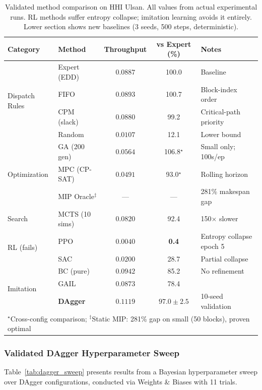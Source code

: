 \documentclass[11pt,a4paper]{article}
\begin{document}
\begin{table}[h]
\centering
\caption{Validated method comparison on HHI Ulsan. All values from actual experimental runs. RL methods suffer entropy collapse; imitation learning avoids it entirely. Lower section shows new baselines (3 seeds, 500 steps, deterministic).}
\label{tab:results_main}
\begin{tabular}{llccl}
\toprule
Category & Method & Throughput & vs Expert (\%) & Notes \\
\midrule
\multirow{4}{*}{Dispatch Rules}
& Expert (EDD) & $0.0887$ & 100.0 & Baseline \\
& FIFO & $0.0893$ & 100.7 & Block-index order \\
& CPM (slack) & $0.0880$ & 99.2 & Critical-path priority \\
& Random & $0.0107$ & 12.1 & Lower bound \\
\midrule
\multirow{3}{*}{Optimization}
& GA (200 gen) & $0.0564$ & 106.8$^\star$ & Small only; 100s/ep \\
& MPC (CP-SAT) & $0.0491$ & 93.0$^\star$ & Rolling horizon \\
& MIP Oracle$^\ddag$ & --- & --- & 281\% makespan gap \\
\midrule
Search
& MCTS (10 sims) & $0.0820$ & 92.4 & 150$\times$ slower \\
\midrule
\multirow{2}{*}{RL (fails)}
& PPO & $0.0040$ & \textbf{0.4} & Entropy collapse epoch 5 \\
& SAC & $0.0200$ & 28.7 & Partial collapse \\
\midrule
\multirow{3}{*}{Imitation}
& BC (pure) & $0.0942$ & 85.2 & No refinement \\
& GAIL & $0.0873$ & 78.4 & \\
& \textbf{DAgger} & $\mathbf{0.1119}$ & $\mathbf{97.0 \pm 2.5}$ & 10-seed validation \\
\bottomrule
\multicolumn{5}{l}{\footnotesize $^\star$Cross-config comparison; $^\ddag$Static MIP: 281\% gap on small (50 blocks), proven optimal} \\
\end{tabular}
\end{table}

\subsubsection{Validated DAgger Hyperparameter Sweep}

Table~\ref{tab:dagger_sweep} presents results from a Bayesian hyperparameter sweep over DAgger configurations, conducted via Weights \& Biases with 11 trials.
\end{document}

